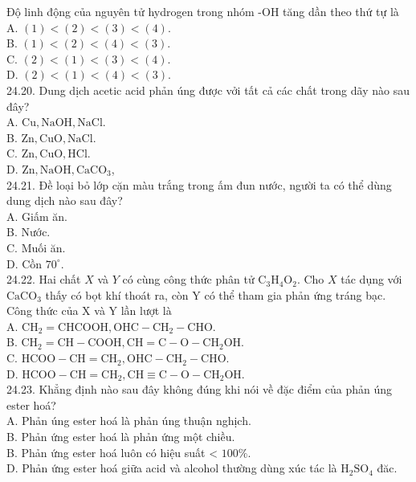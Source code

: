 \documentclass[10pt]{article}
\begin{document}
Độ linh động của nguyên tử hydrogen trong nhóm -OH tăng dần theo thứ tự là\\
A. $(1)<(2)<(3)<(4)$.\\
B. $(1)<(2)<(4)<(3)$.\\
C. $(2)<(1)<(3)<(4)$.\\
D. $(2)<(1)<(4)<(3)$.\\
24.20. Dung dịch acetic acid phản úng được vởi tất cả các chất trong dãy nào sau đây?\\
A. $\mathrm{Cu}, \mathrm{NaOH}, \mathrm{NaCl}$.\\
B. $\mathrm{Zn}, \mathrm{CuO}, \mathrm{NaCl}$.\\
C. $\mathrm{Zn}, \mathrm{CuO}, \mathrm{HCl}$.\\
D. $\mathrm{Zn}, \mathrm{NaOH}, \mathrm{CaCO}_{3}$,\\
24.21. Đề loại bỏ lớp cặn màu trắng trong ấm đun nước, người ta có thể dùng dung dịch nào sau đây?\\
A. Giấm ăn.\\
B. Nước.\\
C. Muối ăn.\\
D. Cồn $70^{\circ}$.\\
24.22. Hai chất $X$ và $Y$ có cùng công thức phân tử $\mathrm{C}_{3} \mathrm{H}_{4} \mathrm{O}_{2}$. Cho $X$ tác dụng với $\mathrm{CaCO}_{3}$ thấy có bọt khí thoát ra, còn Y có thể tham gia phản ứng tráng bạc. Công thức của X và Y lần lượt là\\
A. $\mathrm{CH}_{2}=\mathrm{CHCOOH}, \mathrm{OHC}-\mathrm{CH}_{2}-\mathrm{CHO}$.\\
B. $\mathrm{CH}_{2}=\mathrm{CH}-\mathrm{COOH}, \mathrm{CH}=\mathrm{C}-\mathrm{O}-\mathrm{CH}_{2} \mathrm{OH}$.\\
C. $\mathrm{HCOO}-\mathrm{CH}=\mathrm{CH}_{2}, \mathrm{OHC}-\mathrm{CH}_{2}-\mathrm{CHO}$.\\
D. $\mathrm{HCOO}-\mathrm{CH}=\mathrm{CH}_{2}, \mathrm{CH} \equiv \mathrm{C}-\mathrm{O}-\mathrm{CH}_{2} \mathrm{OH}$.\\
24.23. Khẳng định nào sau đây không đúng khi nói về đặc điểm của phản úng ester hoá?\\
A. Phản úng ester hoá là phản úng thuận nghịch.\\
B. Phản ứng ester hoá là phản ứng một chiều.\\
B. Phản ứng ester hoá luôn có hiệu suất < $100 \%$.\\
D. Phản ứng ester hoá giữa acid và alcohol thường dùng xúc tác là $\mathrm{H}_{2} \mathrm{SO}_{4}$ đăc.\\
\end{document}
